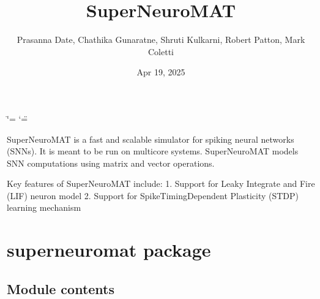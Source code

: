 \documentclass[letterpaper,10pt,english]{sphinxmanual}
\title{SuperNeuroMAT}
\date{Apr 19, 2025}
\author{Prasanna Date, Chathika Gunaratne, Shruti Kulkarni, Robert Patton, Mark Coletti}
\begin{document}
\ifdefined\shorthandoff
  \ifnum\catcode`\=\string=\active\shorthandoff{=}\fi
  \ifnum\catcode`\"=\active{}\fi
\fi

\pagestyle{empty}
\sphinxmaketitle
\pagestyle{plain}
\sphinxtableofcontents
\pagestyle{normal}
\label{\detokenize{index::doc}}


\sphinxAtStartPar
SuperNeuroMAT is a fast and scalable simulator for spiking neural networks (SNNs). It is meant to be run on multi\sphinxhyphen{}core systems. SuperNeuroMAT models SNN computations using matrix and vector operations.

\sphinxAtStartPar
Key features of SuperNeuroMAT include:
1. Support for Leaky Integrate and Fire (LIF) neuron model
2. Support for Spike\sphinxhyphen{}Timing\sphinxhyphen{}Dependent Plasticity (STDP) learning mechanism


\chapter{superneuromat package}
\label{\detokenize{index:superneuromat-package}}

\section{Module contents}
\label{\detokenize{index:module-superneuromat}}\label{\detokenize{index:module-contents}}
\end{document}
